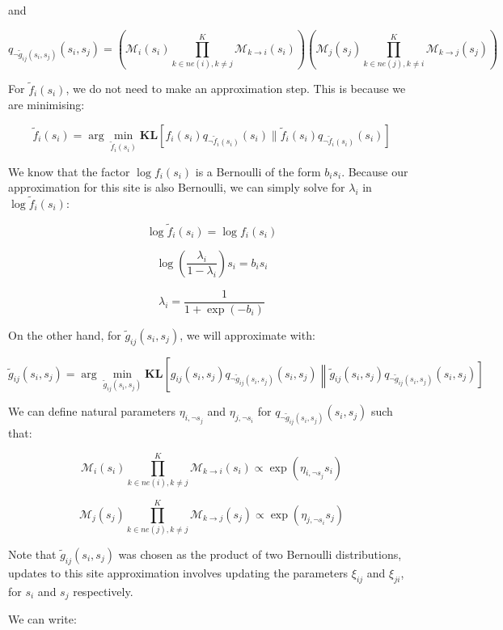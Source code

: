\documentclass[12pt]{article}
\begin{document}
and

\[q_{\neg \tilde{g}_{ij}(s_i, s_j)}(s_i, s_j) = \left( \mathcal{M}_{i}(s_i) \prod_{k\in ne(i), k\neq j}^{K} \mathcal{M}_{k \rightarrow i}(s_i)
\right)\left( \mathcal{M}_{j}(s_j) \prod_{k\in ne(j), k\neq i}^{K} \mathcal{M}_{k \rightarrow j}(s_j)
\right)
\]

For $\tilde{f}_{i}(s_{i})$, we do not need to make an approximation step.
This is because we are minimising:

\[\tilde{f}_{i}(s_{i}) = \arg \min_{\tilde{f}_{i}(s_{i})} \textbf{KL} \left[ f_{i}(s_{i}) q_{\neg \tilde{f}_i(s_i)}(s_i) \| \tilde{f}_{i}(s_{i}) q_{\neg \tilde{f}_i(s_i)}(s_i) \right]\]

We know that the factor $\log f_i(s_i)$ is a Bernoulli of the form $b_i s_i$. Because our approximation for this site is also Bernoulli, we can simply solve for $\lambda_i$ in $\log \tilde{f}_{i}(s_{i})$:

\[\log \tilde{f}_i(s_i) = \log f_{i}(s_{i})\]


\[\log \left(\frac{\lambda_i}{1-\lambda_i} \right)s_i = b_i s_i\]

\[\lambda_i = \frac{1}{1+\exp(-b_i)}\]

On the other hand, for $\tilde{g}_{ij}(s_i, s_j)$, we will approximate with:

\[\tilde{g}_{ij}(s_i, s_j) = \arg \min_{\tilde{g}_{ij}(s_i, s_j)} \textbf{KL} \left[ g_{ij}(s_i, s_j) q_{\neg \tilde{g}_{ij}(s_i, s_j)}(s_i, s_j) \left\| \tilde{g}_{ij}(s_i, s_j) q_{\neg \tilde{g}_{ij}(s_i, s_j)}(s_i, s_j) \right]\]

We can define natural parameters $\eta_{i, \neg s_j}$ and $\eta_{j, \neg s_i}$ for $q_{\neg \tilde{g}_{ij}(s_i, s_j)}(s_i, s_j)$ such that:

\[\mathcal{M}_{i}(s_i) \prod_{k\in ne(i), k\neq j}^{K} \mathcal{M}_{k \rightarrow i}(s_i) \propto \exp(\eta_{i, \neg s_j} s_i)\]

\[ \mathcal{M}_{j}(s_j) \prod_{k\in ne(j), k\neq j}^{K} \mathcal{M}_{k \rightarrow j}(s_j) \propto \exp(\eta_{j, \neg s_i} s_j)\]

Note that $\tilde{g}_{ij}(s_i, s_j)$ was chosen as the product of two Bernoulli distributions, updates to this site approximation involves updating the  parameters $\xi_{ij}$ and $\xi_{ji}$, for $s_i$ and $s_j$ respectively.

We can write:
\end{document}
